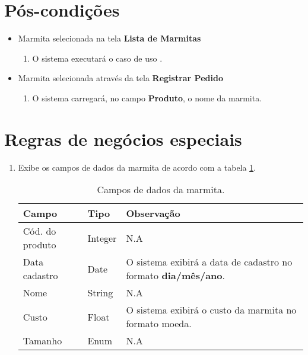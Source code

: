 \section{Pós-condições}

\begin{itemize}
	\item Marmita selecionada na tela \textbf{Lista de Marmitas}
	\begin{enumerate}
		\item O sistema executará o caso de uso .	
	\end{enumerate}

	\item Marmita selecionada através da tela \textbf{Registrar Pedido}
	\begin{enumerate}
		\item O sistema carregará, no campo \textbf{Produto}, o nome da marmita. 
	\end{enumerate}
\end{itemize}

\section{Regras de negócios especiais}

\begin{enumerate}[label=ED\arabic*]
	\item Exibe os campos de dados da marmita de acordo com a tabela \ref{uc012_tb_rn1}. \label{uc012_rn:1}
	\begin{table}[htb]
		\ABNTEXfontereduzida
		\caption[Campos de dados da marmita]{Campos de dados da marmita.}
		\label{uc012_tb_rn1}
		\begin{tabular}{|p{4.0cm}|p{3.0cm}|p{7.25cm}|}
			\hline
			\textbf{Campo}  & \textbf{Tipo} & \textbf{Observação}                                                   \\ \hline
			Cód. do produto & Integer       & N.A                                                                   \\ \hline
			Data cadastro   & Date          & O sistema exibirá a data de cadastro no formato \textbf{dia/mês/ano}. \\ \hline
			Nome            & String        & N.A                                                                   \\ \hline			
			Custo           & Float         & O sistema exibirá o custo da marmita no formato moeda.                \\ \hline
			Tamanho         & Enum          & N.A                                                                   \\ \hline
		\end{tabular}
	\end{table}
\end{enumerate}